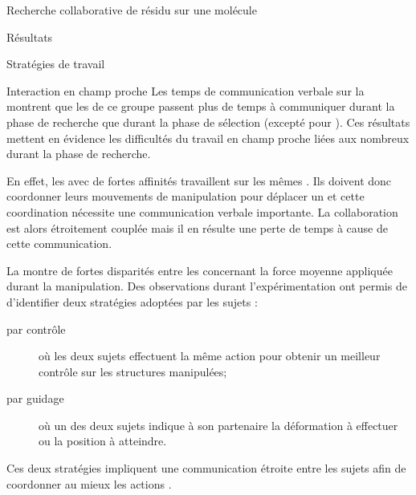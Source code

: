 \documentclass[myfrancais]{mythesis}
\begin{document}
\begin{mychapter}{Recherche collaborative de résidu sur une molécule}
\begin{mysection}{Résultats}
\begin{mysubsection}{Stratégies de travail}
\begin{mysubsubsection}{Interaction en champ proche}
					Les temps de communication verbale sur la  montrent que les  de ce groupe passent plus de temps à communiquer durant la phase de recherche que durant la phase de sélection (excepté pour ).
					Ces résultats mettent en évidence les difficultés du travail en champ proche liées aux nombreux  durant la phase de recherche.

					En effet, les  avec de fortes affinités travaillent sur les mêmes .
					Ils doivent donc coordonner leurs mouvements de manipulation pour déplacer un  et cette coordination nécessite une communication verbale importante.
					La collaboration est alors étroitement couplée mais il en résulte une perte de temps à cause de cette communication.

					La  montre de fortes disparités entre les  concernant la force moyenne appliquée durant la manipulation.
					Des observations durant l'expérimentation ont permis de d'identifier deux stratégies adoptées par les sujets :
					\begin{description}
						\item[par contrôle] où les deux sujets effectuent la même action pour obtenir un meilleur contrôle sur les structures manipulées;
						\item[par guidage] où un des deux sujets indique à son partenaire la déformation à effectuer ou la position à atteindre.
					\end{description}
					Ces deux stratégies impliquent une communication étroite entre les sujets afin de coordonner au mieux les actions .


\end{mysubsubsection}
\end{mysubsection}
\end{mysection}
\end{mychapter}
\end{document}
